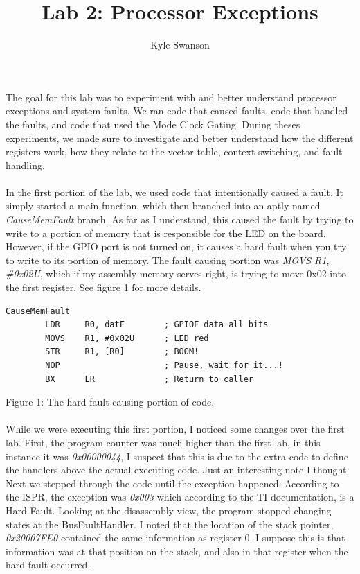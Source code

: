\documentclass[12pt,a4paper]{report}
\author{Kyle Swanson}
\title{Lab 2: Processor Exceptions }
\begin{document}
\maketitle

\paragraph{}
The goal for this lab was to experiment with and better understand processor exceptions and system faults. We ran code that caused faults, code that handled the faults, and code that used the Mode Clock Gating. During theses experiments, we made sure to investigate and better understand how the different registers work, how they relate to the vector table, context switching, and fault handling. 

\paragraph{}
In the first portion of the lab, we used code that intentionally caused a fault. It simply started a main function, which then branched into an aptly named \emph{CauseMemFault} branch. As far as I understand, this caused the fault by trying to write to a portion of memory that is responsible for the LED on the board. However, if the GPIO port is not turned on, it causes a hard fault when you try to write to its portion of memory. The fault causing portion was \emph{MOVS    R1, \#0x02U}, which if my assembly memory serves right, is trying to move 0x02 into the first register. See figure 1 for more details. 

\medskip 

\lstset{language=[x86masm]Assembler}
\begin{lstlisting}
CauseMemFault
        LDR     R0, datF        ; GPIOF data all bits
        MOVS    R1, #0x02U      ; LED red
        STR     R1, [R0]        ; BOOM!
        NOP                     ; Pause, wait for it...!
        BX      LR              ; Return to caller
\end{lstlisting}	
\begin{center}
\small{Figure 1: The hard fault causing portion of code.}
\end{center}

\paragraph{}
While we were executing this first portion, I noticed some changes over the first lab. First, the program counter was much higher than the first lab, in this instance it was \emph{0x00000044}, I suspect that this is due to the extra code to define the handlers above the actual executing code. Just an interesting note I thought. Next we stepped through the code until the exception happened. According to the ISPR, the exception was \emph{0x003} which according to the TI documentation, is a Hard Fault. Looking at the disassembly view, the program stopped changing states at the BusFaultHandler. I noted that the location of the stack pointer, \emph{0x20007FE0} contained the same information as register 0. I suppose this is that information was at that position on the stack, and also in that register when the hard fault occurred. 
\end{document}
